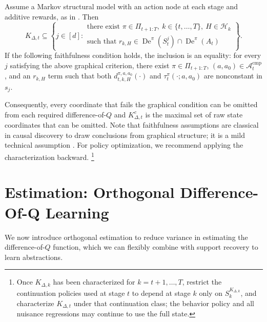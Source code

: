 \documentclass[opre,nonblindrev]{informs4}
\newenvironment{revision}{\begingroup\color{revisionblue}\ignorespaces}{\endgroup}
\newcommand{\blipadv}{\tau}
\begin{document}
\begin{revision}
\begin{proposition}
\label{prop:reward-scope-characterization}
Assume a Markov structural model with an action node at
each stage and additive rewards, as in
. Then
\begin{equation}
K_{\Delta,t}
\subseteq
\left\{
 j\in[d]:
 \begin{array}{l}
 \text{there exist }
 \pi\in\Pi_{t+1:T},\
 k\in\{t,\ldots,T\},\
 H\in\mathcal H_k
 \\[1mm]
 \text{such that }
 r_{k,H}
 \in
 \operatorname{De}^{\pi}(S_t^j)
 \cap
 \operatorname{De}^{\pi}(A_t)
\end{array}
\right\}.
\label{eq:graphical-decision-support}
\end{equation}
If the following faithfulness condition holds, the inclusion is an equality:
for every \(j\) satisfying the above graphical criterion, there exist
\(\pi\in\Pi_{t+1:T}\), \((a,a_0)\in\mathcal A_t^{\mathrm{cmp}}\), and an $r_{k,H}$ term such that both
\(d_{t,k,H}^{\pi,a,a_0}(\cdot)\) and
\(\blipadv_t^\pi(\cdot;a,a_0)\) are nonconstant in \(s_j\).
\end{proposition}
Consequently, every coordinate that fails the graphical condition can be
omitted from each required difference-of-$Q$ and \(K_{\Delta,t}^c\) is the maximal set of raw state
coordinates that can be omitted. Note that faithfulness assumptions are classical in causal discovery to draw conclusions from graphical structure; it is a mild technical assumption \citep{spirtes2001causation}. For policy optimization, we recommend applying
the characterization backward. \footnote{Once $K_{\Delta,k}$ has been characterized for
$k=t+1,\ldots,T$, restrict the
continuation policies used at stage $t$ to depend at stage $k$ only on
$S_k^{K_{\Delta,k}}$, and characterize $K_{\Delta,t}$ under that
continuation class; the behavior policy and
all nuisance regressions may continue to use the full state.}
\end{revision}


\section{Estimation: Orthogonal Difference-Of-Q Learning}\label{sec-method}

We now introduce orthogonal estimation to reduce variance in estimating the difference-of-$Q$ function, which we can flexibly combine with support recovery to learn abstractions. 
\end{document}
